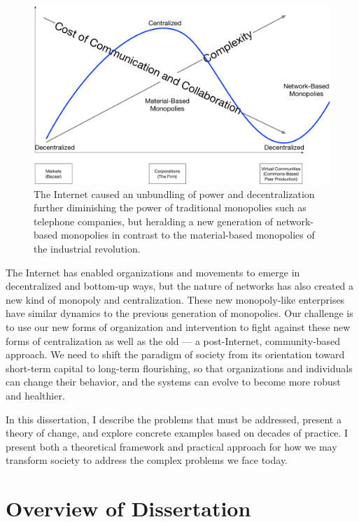 \begin{figure}[t]
 \centering
 \includegraphics[width=1\textwidth]{pictures/TheInternetMarkets2}
 \caption[The Internet decentralized some monopolies but created new network-based monopolies.]{The Internet caused an unbundling of power and decentralization further diminishing the power of traditional monopolies such as telephone companies, but heralding a new generation of network-based monopolies in contrast to the material-based monopolies of the industrial revolution.}
 \label{fig:netmonopoly}
\end{figure}

The Internet has enabled organizations and movements to emerge in decentralized and bottom-up ways, but the nature of networks has also created a new kind of monopoly and centralization. These new monopoly-like enterprises have similar dynamics to the previous generation of monopolies. Our challenge is to use our new forms of organization and intervention to fight against these new forms of centralization as well as the old --- a post-Internet, community-based approach. We need to shift the paradigm of society from its orientation toward short-term capital to long-term flourishing, so that organizations and individuals can change their behavior, and the systems can evolve to become more robust and healthier.

In this dissertation, I describe the problems that must be addressed, present a theory of change, and explore concrete examples based on decades of practice. I present both a theoretical framework and practical approach for how we may transform society to address the complex problems we face today.

\section{Overview of Dissertation}
\label{intro:overview}

